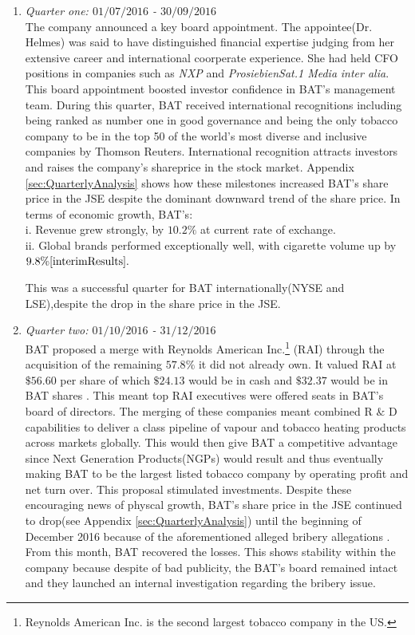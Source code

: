 \documentclass[letterpaper, 10 pt, conference]{ieeeconf}  %
\begin{document}
 	\begin{enumerate}
 		\item[1.]\textit{Quarter one: $01/07/2016$ - $ 30/09/2016$}
 		\\
 		The company announced a key board appointment. The appointee(Dr. Helmes) was said to have distinguished financial expertise judging from her extensive career  and international coorperate experience. She had held CFO positions in companies such as \textit{NXP} and  \textit{ProsiebienSat.1 Media} \textit{inter alia}\cite{Board_Appointment}. This board appointment boosted investor confidence in BAT's management team. During this quarter,  BAT received international recognitions including being ranked as number one in good governance and being the only tobacco company to be in the top 50 of the world's most diverse and inclusive companies by Thomson Reuters. International recognition attracts investors and raises the company's shareprice in the stock market. Appendix \ref{sec:QuarterlyAnalysis} shows how these milestones increased BAT's share price in the JSE despite the dominant downward trend of the share price. In terms of economic growth, BAT's:
 		\\
 		\hspace{2.00cm}i. Revenue grew strongly, by $10.2\%$ at current rate of exchange\cite{interimResults}.
 		\\
 		\hspace{1.8500cm} ii. Global brands performed exceptionally well, with cigarette volume up by $9.8\%\cite{interimResults}.$	
 		
 		This was  a successful quarter for BAT internationally(NYSE and LSE),despite the drop in the share price in the JSE. 
 		
 		\item[2.]\textit{Quarter two: $01/10/2016$ - $31/12/2016$}
 		\\
 		BAT proposed a merge with Reynolds American Inc.\footnote{Reynolds American Inc. is the second largest tobacco company in the US.} (RAI) through the acquisition of the remaining $57.8 \% $ it did not already own. It valued RAI at $\$ 56.60$ per share of which $\$ 24.13$ would be in cash and $\$ 32.37$ would be in BAT shares \cite{Proposes_Merger}. This meant top RAI executives were offered seats in BAT's board of directors. The merging of these companies meant combined R $\&$ D capabilities to deliver a class pipeline of vapour and tobacco heating products across markets globally. This would then give BAT a competitive advantage since Next Generation Products(NGPs) would result and thus eventually making BAT to be the largest listed tobacco company by operating profit and net turn over. This proposal stimulated investments. Despite these encouraging news of physcal growth, BAT's share price in the JSE continued to drop(see Appendix \ref{sec:QuarterlyAnalysis}) until the beginning of December 2016 because of the aforementioned alleged bribery allegations  . From this month, BAT recovered the losses. This shows stability within the company because despite of bad publicity, the BAT's board remained intact and they launched an internal investigation regarding the bribery issue.
 		

\end{enumerate}
\end{document}
